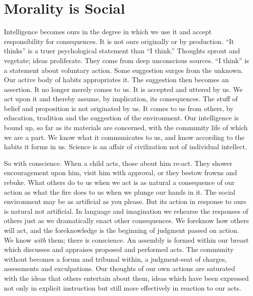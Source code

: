 
\author{John Dewey}
\chapter{Morality is Social}

Intelligence becomes ours in the degree in which we use it
and accept responsibility for consequences. It is not ours originally
or by production. ``It thinks'' is a truer psychological statement
than ``I think.'' Thoughts sprout and vegetate; ideas proliferate.
They come from deep unconscious sources. ``I think'' is a statement
about voluntary action. Some suggestion surges from the unknown. Our
active body of habits appropriates it. The suggestion then becomes an
assertion. It no longer merely comes to us. It is accepted and uttered
by us. We act upon it and thereby assume, by implication, its
consequences. The stuff of belief and proposition is not originated by
us. It comes to us from others, by education, tradition and the
suggestion of the environment. Our intelligence is bound up, so far as
its materials are concerned, with the community life of which we are a
part. We know what it communicates to us, and know according to the
habits it forms in us. Science is an affair of civilization not of
individual intellect.

So with conscience. When a child acts, those about him re-act. They
shower encouragement upon him, visit him with approval, or they bestow
frowns and rebuke. What others do	to us when we act is as natural a
consequence of our action as what the fire does  to us when
we plunge our hands in it. The social environment may be as artificial
as you please. But its action in response to ours is natural not
artificial. In language and imagination we rehearse the responses of
others just as we dramatically enact other consequences. We foreknow
how others will act, and the foreknowledge is the beginning of
judgment passed on action. We know \textit{with} them; there is
conscience. An assembly is formed within our breast which discusses
and appraises proposed and performed acts. The community without
becomes a forum and tribunal within, a judgment-seat of charges,
assessments and exculpations. Our thoughts of our own actions are
saturated with the ideas that others entertain about them, ideas which
have been expressed not only in explicit instruction but still more
effectively in reaction to our acts.

